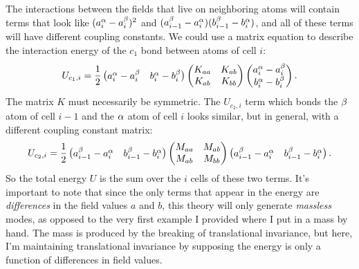 \documentclass[12pt]{article}
\begin{document}
The interactions between the fields that live on neighboring atoms will contain 
terms that look like $(a^\alpha_i - a^\beta_i)^2$ and $(a^\beta_{i-1} - 
a^\alpha_i)(b^\beta_{i-1} - b^\alpha_i)$, and all of these terms will have different 
coupling constants. We could use a matrix equation to describe the interaction 
energy of the $c_1$ bond between atoms of cell $i$:
\[ U_{c_1,i} = \frac{1}{2} \left(\begin{matrix}a^\alpha_i - a^\beta_i & b^\alpha_i - b^\beta_i\end{matrix}\right)
 \left(\begin{matrix}K_{aa} & K_{ab} \\ K_{ab} & K_{bb}\end{matrix}\right) \left(\begin{matrix}a^\alpha_i - a^\beta_i \\ b^\alpha_i - 
b^\beta_i\end{matrix}\right).\]
The matrix $K$ must necessarily be symmetric. The $U_{c_2,i}$ term which bonds 
the $\beta$ atom of cell $i-1$ and the $\alpha$ atom of cell $i$ looks similar, but in 
general, with a different coupling constant matrix:
\[ U_{c_2,i} = \frac{1}{2} \left(\begin{matrix}a^\beta_{i-1} - a^\alpha_i & b^\beta_{i-1} - b^\alpha_i\end{matrix}\right)
 \left(\begin{matrix}M_{aa} & M_{ab} \\ M_{ab} & M_{bb}\end{matrix}\right) \left(\begin{matrix}a^\beta_{i-1} - a^\alpha_i & 
b^\beta_{i-1} - b^\alpha_i\end{matrix}\right).\]
So the total energy $U$ is the sum over the $i$ cells of these two terms. It's 
important to note that since the only terms that appear in the energy are 
\emph{differences} in the field values $a$ and $b$, this theory will only 
generate \emph{massless} modes, as opposed to the very first example I 
provided where I put in a mass by hand. The mass is produced by the breaking of 
translational invariance, but here, I'm maintaining translational invariance by 
supposing the energy is only a function of differences in field values.
\end{document}
